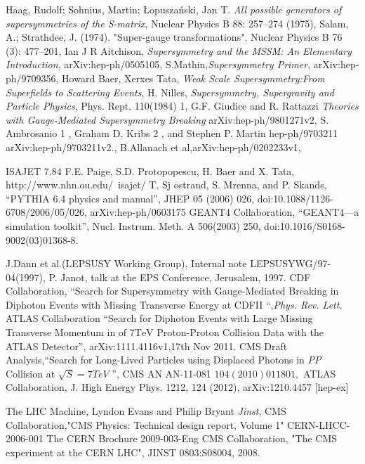 \begin{thebibliography}{9}
 Haag, Rudolf; Sohnius, Martin; Łopuszański, Jan T. \textit{All possible generators of supersymmetries of the S-matrix}, Nuclear Physics B 88: 257–274 (1975),
 Salam, A.; Strathdee, J. (1974). "Super-gauge transformations". Nuclear Physics B 76 (3): 477–201,
 Ian J R Aitchison, \textit{Supersymmetry and the MSSM: An Elementary Introduction}, arXiv:hep-ph/0505105,
 S.Mathin,\textit{Supersymmetry Primer}, arXiv:hep-ph/9709356,
 Howard Baer, Xerxes Tata, \textit{Weak Scale Supersymmetry:From Superfields to Scattering Events},
 H. Nilles, \textit{Supersymmetry, Supergravity and Particle Physics}, Phys. Rept. 110(1984) 1,
G.F. Giudice and R. Rattazzi \textit{Theories with Gauge-Mediated Supersymmetry Breaking} arXiv:hep-ph/9801271v2,
 S. Ambrosanio 1 , Graham D. Kribs 2 , and Stephen P. Martin hep-ph/9703211 arXiv:hep-ph/9703211v2.,
 B.Allanach et al,arXiv:hep-ph/0202233v1,

 ISAJET 7.84 F.E. Paige, S.D. Protopopescu, H. Baer and X. Tata, http://www.nhn.ou.edu/~isajet/
 T. Sj ostrand, S. Mrenna, and P. Skands, “PYTHIA 6.4 physics and manual”, JHEP 05 (2006) 026, doi:10.1088/1126-6708/2006/05/026, arXiv:hep-ph/0603175
 GEANT4 Collaboration, “GEANT4—a simulation toolkit”, Nucl. Instrum. Meth. A 506(2003) 250, doi:10.1016/S0168-9002(03)01368-8.


J.Dann et al.(LEPSUSY Working Group), Internal note LEPSUSYWG/97-04(1997), P. Janot, talk at the EPS Conference, Jerusalem, 1997.
CDF Collaboration, ``Search for Supersymmetry with Gauge-Mediated Breaking in Diphoton Events with Missing Transverse Energy at CDFII ``,\emph{Phys. Rev. Lett.}
 ATLAS Collaboration ``Search for Diphoton Events with Large Missing Transverse Momentum in  of $\text{7TeV}$ Proton-Proton Collision Data with the ATLAS Detector'', arXiv:1111.4116v1,17th Nov 2011. 
CMS Draft Analysis,``Search for Long-Lived Particles using Displaced Photons in \emph{PP} Collision at $\sqrt{S}=7TeV$ '', CMS AN AN-11-081 \emph{$104(2010) 011801,$}
ATLAS Collaboration, J. High Energy Phys. 1212, 124
(2012), arXiv:1210.4457 [hep-ex]

 The LHC Machine, Lyndon Evans and Philip Bryant \textit{Jinst},
CMS Collaboration,"CMS Physics: Technical design report, Volume 1" CERN-LHCC-2006-001
 The CERN Brochure 2009-003-Eng
CMS Collaboration, "The CMS experiment at the CERN LHC", JINST 0803:S08004, 2008.


\end{thebibliography}
